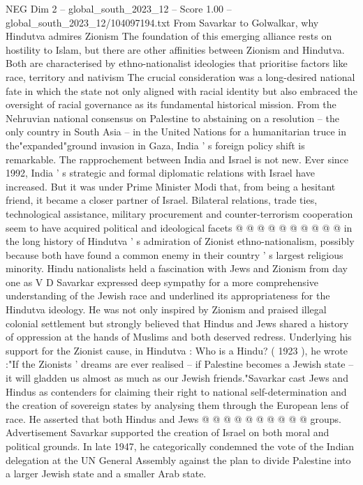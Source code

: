 \begin{textsample}{NEG Dim 2 – global\_south\_2023\_12 – Score 1.00 – global\_south\_2023\_12/104097194.txt}  \label{ex:f2_neg_424}
From Savarkar to Golwalkar, why Hindutva admires Zionism The foundation of this emerging alliance rests on hostility to Islam, but there are other affinities between Zionism and Hindutva.
Both are characterised by ethno-nationalist ideologies that prioritise factors like race, territory and nativism The crucial consideration was a long-desired national fate in which the state not only aligned with racial identity but also embraced the oversight of racial governance as its fundamental historical mission.
From the Nehruvian national consensus on Palestine to abstaining on a resolution -- the only country in South Asia -- in the United Nations for a humanitarian truce in the"expanded"ground invasion in Gaza, India ' s foreign policy shift is remarkable.
The rapprochement between India and Israel is not new.
Ever since 1992, India ' s strategic and formal diplomatic relations with Israel have increased.
But it was under Prime Minister Modi that, from being a hesitant friend, it became a closer partner of Israel.
Bilateral relations, trade ties, technological assistance, military procurement and counter-terrorism cooperation seem to have acquired political and ideological facets @ @ @ @ @ @ @ @ @ @ in the long history of Hindutva ' s admiration of Zionist ethno-nationalism, possibly because both have found a common enemy in their country ' s largest religious minority.
Hindu nationalists held a fascination with Jews and Zionism from day one as V D Savarkar expressed deep sympathy for a more comprehensive understanding of the Jewish race and underlined its appropriateness for the Hindutva ideology.
He was not only inspired by Zionism and praised illegal colonial settlement but strongly believed that Hindus and Jews shared a history of oppression at the hands of Muslims and both deserved redress.
Underlying his support for the Zionist cause, in Hindutva : Who is a Hindu? ( 1923 ), he wrote :"If the Zionists ' dreams are ever realised -- if Palestine becomes a Jewish state -- it will gladden us almost as much as our Jewish friends."Savarkar cast Jews and Hindus as contenders for claiming their right to national self-determination and the creation of sovereign states by analysing them through the European lens of race.
He asserted that both Hindus and Jews @ @ @ @ @ @ @ @ @ @ groups.
Advertisement Savarkar supported the creation of Israel on both moral and political grounds.
In late 1947, he categorically condemned the vote of the Indian delegation at the UN General Assembly against the plan to divide Palestine into a larger Jewish state and a smaller Arab state.

\end{textsample}
